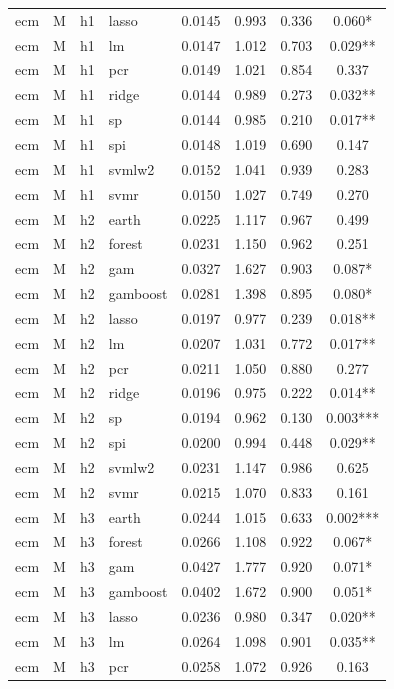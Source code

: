 \begin{ThreePartTable}
\begin{longtable}[t]{llclcccc}
ecm & M & h1 & lasso & 0.0145 & 0.993 & 0.336 & 0.060*\\
ecm & M & h1 & lm & 0.0147 & 1.012 & 0.703 & 0.029**\\
ecm & M & h1 & pcr & 0.0149 & 1.021 & 0.854 & 0.337\\
ecm & M & h1 & ridge & 0.0144 & 0.989 & 0.273 & 0.032**\\
ecm & M & h1 & sp & 0.0144 & 0.985 & 0.210 & 0.017**\\
ecm & M & h1 & spi & 0.0148 & 1.019 & 0.690 & 0.147\\
ecm & M & h1 & svmlw2 & 0.0152 & 1.041 & 0.939 & 0.283\\
ecm & M & h1 & svmr & 0.0150 & 1.027 & 0.749 & 0.270\\
\addlinespace
ecm & M & h2 & earth & 0.0225 & 1.117 & 0.967 & 0.499\\
ecm & M & h2 & forest & 0.0231 & 1.150 & 0.962 & 0.251\\
ecm & M & h2 & gam & 0.0327 & 1.627 & 0.903 & 0.087*\\
ecm & M & h2 & gamboost & 0.0281 & 1.398 & 0.895 & 0.080*\\
ecm & M & h2 & lasso & 0.0197 & 0.977 & 0.239 & 0.018**\\
ecm & M & h2 & lm & 0.0207 & 1.031 & 0.772 & 0.017**\\
ecm & M & h2 & pcr & 0.0211 & 1.050 & 0.880 & 0.277\\
ecm & M & h2 & ridge & 0.0196 & 0.975 & 0.222 & 0.014**\\
ecm & M & h2 & sp & 0.0194 & 0.962 & 0.130 & 0.003***\\
ecm & M & h2 & spi & 0.0200 & 0.994 & 0.448 & 0.029**\\
ecm & M & h2 & svmlw2 & 0.0231 & 1.147 & 0.986 & 0.625\\
ecm & M & h2 & svmr & 0.0215 & 1.070 & 0.833 & 0.161\\
\addlinespace
ecm & M & h3 & earth & 0.0244 & 1.015 & 0.633 & 0.002***\\
ecm & M & h3 & forest & 0.0266 & 1.108 & 0.922 & 0.067*\\
ecm & M & h3 & gam & 0.0427 & 1.777 & 0.920 & 0.071*\\
ecm & M & h3 & gamboost & 0.0402 & 1.672 & 0.900 & 0.051*\\
ecm & M & h3 & lasso & 0.0236 & 0.980 & 0.347 & 0.020**\\
ecm & M & h3 & lm & 0.0264 & 1.098 & 0.901 & 0.035**\\
ecm & M & h3 & pcr & 0.0258 & 1.072 & 0.926 & 0.163\\

\end{longtable}
\end{ThreePartTable}
